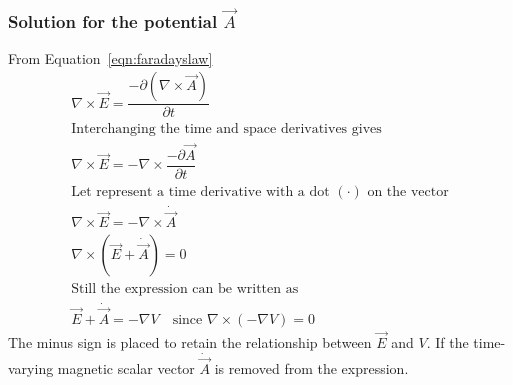 \subsubsection*{Solution for the potential $\vec{A}$}
From Equation~\eqref{eqn:faradayslaw}
\begin{align*}
&\nabla\times\vec{E}=\dfrac{-\partial(\nabla\times\vec{A})}{\partial t}&\\
&\text{Interchanging the time and space derivatives gives}&\\
&\nabla\times\vec{E}=-\nabla\times\dfrac{-\partial\vec{A}}{\partial t}&\\
&\text{Let represent a time derivative with a dot }(\cdot)\text{ on the vector}&\\
&\nabla\times\vec{E}=-\nabla\times\dot{\vec{A}}&\\
&\nabla\times(\vec{E}+\dot{\vec{A}})=0&\\
&\text{Still the expression can be written as}&\\
&\vec{E}+\dot{\vec{A}}= -\nabla V\quad\text{since }\nabla\times(-\nabla V)=0&
\end{align*}
The minus sign is placed to retain the relationship between $\vec{E}$ and $V$. If the time-varying magnetic scalar vector $\dot{\vec{A}}$ is removed from the expression.

